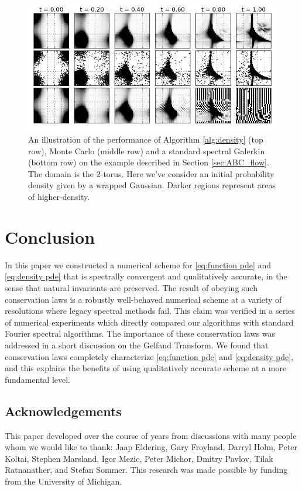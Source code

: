 \documentclass[final,leqno]{siamart}
\begin{document}
\begin{figure}[h!]
	\centering
	\includegraphics[width=1\textwidth]{./images/ABCD_flow.png}
	\caption{An illustration of the performance of Algorithm \ref{alg:density} (top row), Monte Carlo (middle row) and a standard spectral Galerkin (bottom row) on the example described in Section \ref{sec:ABC_flow}.
	The domain is the $2$-torus.  Here we've consider an initial probability density given by a wrapped Gaussian. Darker regions represent areas of higher-density.}
	\label{fig:ABCD}
\end{figure}


\section{Conclusion}

In this paper we constructed a numerical scheme for \eqref{eq:function pde} and \eqref{eq:density pde} that is spectrally convergent and qualitatively accurate, in the sense that natural invariants are preserved.
The result of obeying such conservation laws is a robustly well-behaved numerical scheme at a variety of resolutions where legacy spectral methods fail.
This claim was verified in a series of numerical experiments which directly compared our algorithms with standard Fourier spectral algorithms.
The importance of these conservation laws was addressed in a short discussion on the Gelfand Transform.
We found that conservation laws completely characterize \eqref{eq:function pde} and \eqref{eq:density pde}, and this explains the benefits of using qualitatively accurate scheme at a more fundamental level.


\subsection{Acknowledgements}
This paper developed over the course of years from discussions with many people whom we would like to thank: Jaap Eldering, Gary Froyland,
 	Darryl Holm, Peter Koltai, Stephen Marsland, Igor Mezic, Peter Michor, Dmitry Pavlov, Tilak Ratnanather, and Stefan Sommer. 
This research was made possible by funding from the University of Michigan.
\end{document}
